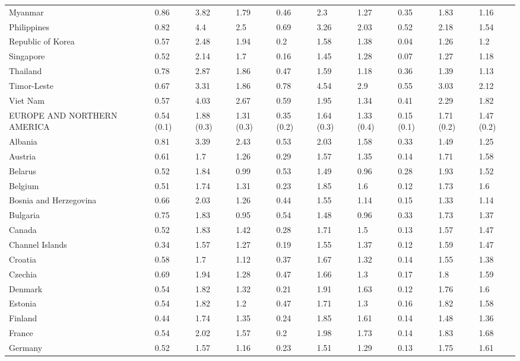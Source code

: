 \begin{longtable}[t]{llllllllll}
Myanmar & 0.86 & 3.82 & 1.79 & 0.46 & 2.3 & 1.27 & 0.35 & 1.83 & 1.16\\
Philippines & 0.82 & 4.4 & 2.5 & 0.69 & 3.26 & 2.03 & 0.52 & 2.18 & 1.54\\
Republic of Korea & 0.57 & 2.48 & 1.94 & 0.2 & 1.58 & 1.38 & 0.04 & 1.26 & 1.2\\
Singapore & 0.52 & 2.14 & 1.7 & 0.16 & 1.45 & 1.28 & 0.07 & 1.27 & 1.18\\
Thailand & 0.78 & 2.87 & 1.86 & 0.47 & 1.59 & 1.18 & 0.36 & 1.39 & 1.13\\
Timor-Leste & 0.67 & 3.31 & 1.86 & 0.78 & 4.54 & 2.9 & 0.55 & 3.03 & 2.12\\
Viet Nam & 0.57 & 4.03 & 2.67 & 0.59 & 1.95 & 1.34 & 0.41 & 2.29 & 1.82\\
EUROPE AND NORTHERN AMERICA & 0.54 (0.1) & 1.88 (0.3) & 1.31 (0.3) & 0.35 (0.2) & 1.64 (0.3) & 1.33 (0.4) & 0.15 (0.1) & 1.71 (0.2) & 1.47 (0.2)\\
Albania & 0.81 & 3.39 & 2.43 & 0.53 & 2.03 & 1.58 & 0.33 & 1.49 & 1.25\\
Austria & 0.61 & 1.7 & 1.26 & 0.29 & 1.57 & 1.35 & 0.14 & 1.71 & 1.58\\
Belarus & 0.52 & 1.84 & 0.99 & 0.53 & 1.49 & 0.96 & 0.28 & 1.93 & 1.52\\
Belgium & 0.51 & 1.74 & 1.31 & 0.23 & 1.85 & 1.6 & 0.12 & 1.73 & 1.6\\
Bosnia and Herzegovina & 0.66 & 2.03 & 1.26 & 0.44 & 1.55 & 1.14 & 0.15 & 1.33 & 1.14\\
Bulgaria & 0.75 & 1.83 & 0.95 & 0.54 & 1.48 & 0.96 & 0.33 & 1.73 & 1.37\\
Canada & 0.52 & 1.83 & 1.42 & 0.28 & 1.71 & 1.5 & 0.13 & 1.57 & 1.47\\
Channel Islands & 0.34 & 1.57 & 1.27 & 0.19 & 1.55 & 1.37 & 0.12 & 1.59 & 1.47\\
Croatia & 0.58 & 1.7 & 1.12 & 0.37 & 1.67 & 1.32 & 0.14 & 1.55 & 1.38\\
Czechia & 0.69 & 1.94 & 1.28 & 0.47 & 1.66 & 1.3 & 0.17 & 1.8 & 1.59\\
Denmark & 0.54 & 1.82 & 1.32 & 0.21 & 1.91 & 1.63 & 0.12 & 1.76 & 1.6\\
Estonia & 0.54 & 1.82 & 1.2 & 0.47 & 1.71 & 1.3 & 0.16 & 1.82 & 1.58\\
Finland & 0.44 & 1.74 & 1.35 & 0.24 & 1.85 & 1.61 & 0.14 & 1.48 & 1.36\\
France & 0.54 & 2.02 & 1.57 & 0.2 & 1.98 & 1.73 & 0.14 & 1.83 & 1.68\\
Germany & 0.52 & 1.57 & 1.16 & 0.23 & 1.51 & 1.29 & 0.13 & 1.75 & 1.61\\

\end{longtable}
